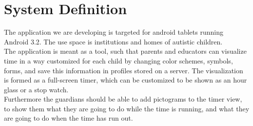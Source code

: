 \chapter{System Definition}
The application we are developing is targeted for android tablets running Android 3.2. The use space is institutions and homes of autistic children.\\
   The application is meant as a tool, such that parents and educators can visualize time in a way customized for each child by changing color schemes, symbols, forms, and save this information in profiles stored on a server. The visualization is formed as a full-screen timer, which can be customized to be shown as an hour glass or a stop watch.\\
   Furthermore the guardians should be able to add pictograms to the timer view, to show them what they are going to do while the time is running, and what they are going to do when the time has run out.
   
\begin{comment}   
  In addition, the timer application should be used to control the allowed time spent on other applications, such as games. When the launcher is in autist mode, the timer application should be opened as an overlay whenever another application is opened. This overlay shows how much time is left, and when the time is up, it will lock the given application with a customized cooldown. Also the timer application should include a timelock, such that other applications are only available in specific time spans.
\end{comment}